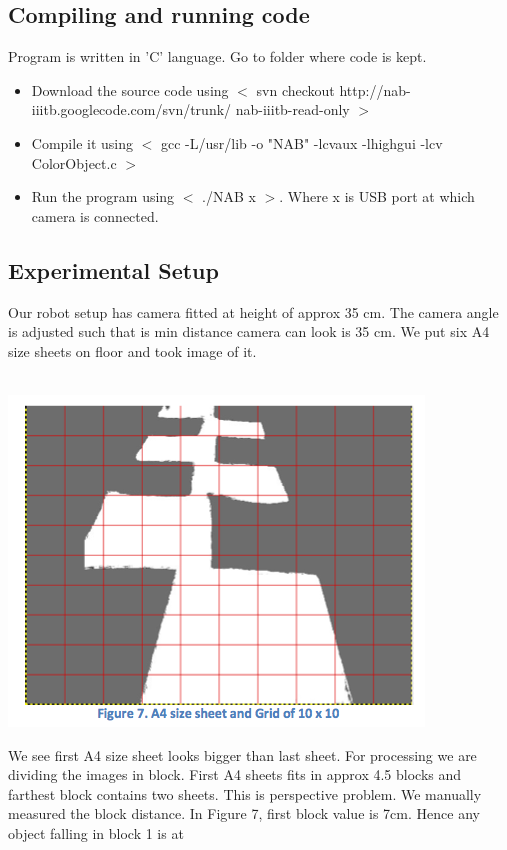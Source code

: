 \documentclass[12pt]{article}
\begin{document}
\subsection{Compiling and running code}
Program is written in 'C' language. Go to folder where code is kept.
\begin{itemize}
\item Download the source code using $<$ svn checkout http://nab- iiitb.googlecode.com/svn/trunk/ nab-iiitb-read-only $>$
\item Compile it using $<$ gcc -L/usr/lib -o "NAB" -lcvaux -lhighgui -lcv ColorObject.c $>$
\item Run the program using $<$ ./NAB x $>$. Where x is USB port at which camera is connected.
\end{itemize}

\subsection{Experimental Setup}
Our robot setup has camera fitted at height of approx 35 cm. The camera angle is adjusted such that is min distance camera can look is 35 cm. We put six A4 size sheets on floor and took image of it.\\
\\
\begin{center} \includegraphics[scale=0.4]{a4} \end{center}
We see first A4 size sheet looks bigger than last sheet. For processing we are dividing the images in block. First A4 sheets fits in approx 4.5 blocks and farthest block contains two sheets. This is perspective problem. We manually measured the block distance. In Figure 7, first block value is 7cm. Hence any object falling in block 1 is at
\end{document}
